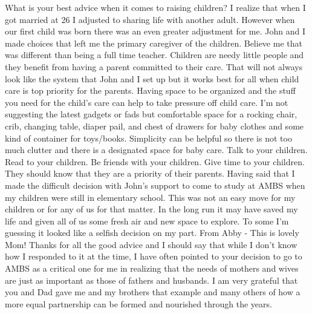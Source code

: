 What is your best advice when it comes to raising children?
I realize that when I got married at 26 I adjusted to sharing life with another adult. However when our first child was born there was an even greater adjustment for me. John and I made choices that left me the primary caregiver of the children. Believe me that was different than being a full time teacher. Children are needy little people and they benefit from having a parent committed to their care. That will not always look like the system that John and I set up but it works best for all when child care is top priority for the parents.
Having space to be organized and the stuff you need for the child's care can help to take pressure off child care. I'm not suggesting the latest gadgets or fads but comfortable space for a rocking chair, crib, changing table, diaper pail, and chest of drawers for baby clothes and some kind of container for toys/books. Simplicity can be helpful so there is not too much clutter and there is a designated space for baby care. 
Talk to your children. Read to your children. Be friends with your children. Give time to your children. They should know that they are a priority of their parents.
Having said that I made the difficult decision with John's support to come to study at AMBS when my children were still in elementary school. This was not an easy move for my children or for any of us for that matter. In the long run it may have saved my life and given all of us some fresh air and new space to explore. To some I'm guessing it looked like a selfish decision on my part. 
From Abby - This is lovely Mom! Thanks for all the good advice and I should say that while I don't know how I responded to it at the time, I have often pointed to your decision to go to AMBS as a critical one for me in realizing that the needs of mothers and wives are just as important as those of fathers and husbands. I am very grateful that you and Dad gave me and my brothers that example and many others of how a more equal partnership can be formed and nourished through the years.




